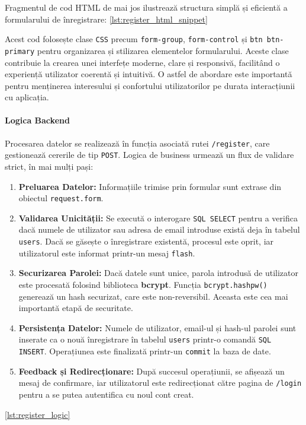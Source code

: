 \documentclass[12pt, a4paper, oneside, romanian]{teza-upb}
\begin{document}
Fragmentul de cod HTML de mai jos ilustrează structura simplă și eficientă a formularului de înregistrare: \ref{lst:register_html_snippet}



Acest cod folosește clase \texttt{CSS} precum \texttt{form-group}, \texttt{form-control} și \texttt{btn btn-primary} pentru organizarea și stilizarea elementelor formularului. Aceste clase contribuie la crearea unei interfețe moderne, clare și responsivă, facilitând o experiență utilizator coerentă și intuitivă. O astfel de abordare este importantă pentru menținerea interesului și confortului utilizatorilor pe durata interacțiunii cu aplicația.


\paragraph{Logica Backend}
Procesarea datelor se realizează în funcția asociată rutei \texttt{/register}, care gestionează cererile de tip \texttt{POST}. Logica de business urmează un flux de validare strict, în mai mulți pași:
\begin{enumerate}
	\item \textbf{Preluarea Datelor:} Informațiile trimise prin formular sunt extrase din obiectul \texttt{request.form}.
	\item \textbf{Validarea Unicității:} Se execută o interogare \texttt{SQL SELECT} pentru a verifica dacă numele de utilizator sau adresa de email introduse există deja în tabelul \texttt{users}. Dacă se găsește o înregistrare existentă, procesul este oprit, iar utilizatorul este informat printr-un mesaj \texttt{flash}.
	\item \textbf{Securizarea Parolei:} Dacă datele sunt unice, parola introdusă de utilizator este procesată folosind biblioteca \textbf{bcrypt}. Funcția \texttt{bcrypt.hashpw()} generează un hash securizat, care este non-reversibil. Aceasta este cea mai importantă etapă de securitate.
	\item \textbf{Persistența Datelor:} Numele de utilizator, email-ul și hash-ul parolei sunt inserate ca o nouă înregistrare în tabelul \texttt{users} printr-o comandă \texttt{SQL INSERT}. Operațiunea este finalizată printr-un \texttt{commit} la baza de date.
	\item \textbf{Feedback și Redirecționare:} După succesul operațiunii, se afișează un mesaj de confirmare, iar utilizatorul este redirecționat către pagina de \texttt{/login} pentru a se putea autentifica cu noul cont creat.
\end{enumerate} \ref{lst:register_logic}
\end{document}
